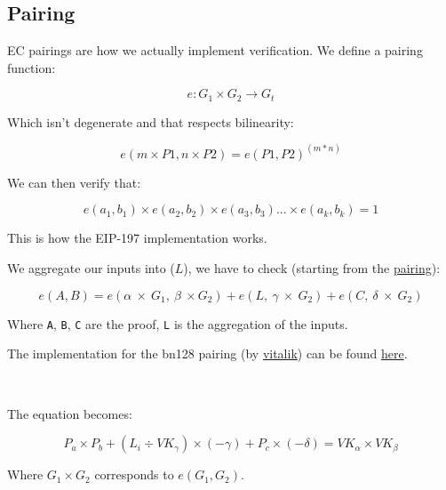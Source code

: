 \documentclass{article}
\begin{document}
\subsection{Pairing}

EC pairings are how we actually implement verification. We define a pairing function:

\[ e: G_1 \times  G_2 \rightarrow G_t \]

Which isn't degenerate and that respects bilinearity:

\[ e ( m \times P1, n \times P2) = e ( P1, P2 ) ^ ( m * n ) \]

We can then verify that:

\[ e ( a_1, b_1) \times e ( a_2, b_2 ) \times e ( a_3, b_3 ) ... \times e ( a_k, b_k ) = 1 \]

This is how the EIP-197 implementation works.

We aggregate our inputs into (\(L\)), we have to check (starting from the \href{https://xn--2-umb.com/22/pairings/index.html}{pairing}):

\[ e(A, B) = e(\alpha \ \times \ G_1, \ \beta \ \times G_2) + e(L, \ \gamma \ \times \ G_2) + e(C, \ \delta \ \times \ G_2)\]

Where \texttt{A}, \texttt{B}, \texttt{C} are the proof, \texttt{L} is the aggregation of the inputs.

The implementation for the bn128 pairing (by \href{https://vitalik.ca}{vitalik}) can be found \href{https://github.com/ethereum/py_pairing/blob/master/py_ecc/bn128/bn128_pairing.py#L68}{here}.

\

The equation becomes:

\[ P_a \times P_b + ( L_i \div VK_{\gamma} ) \times ( - \gamma ) + P_c \times ( - \delta ) = VK_{\alpha} \times VK_{\beta} \]

Where \( G_1 \times G_2 \) corresponds to \( e ( G_1 , G_2 ) \).
\end{document}
